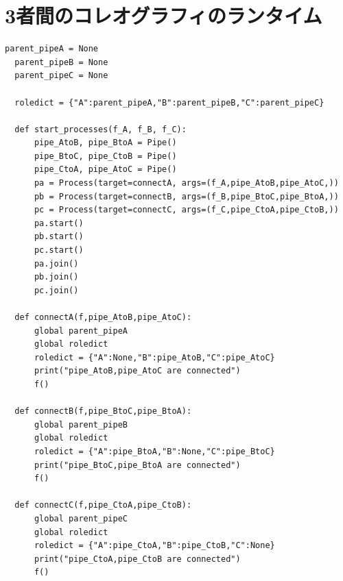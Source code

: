 \documentclass{thesis}
\begin{document}
\chapter{3者間のコレオグラフィのランタイム}
\begin{lstlisting}[numbers = none]
  parent_pipeA = None 
  parent_pipeB = None 
  parent_pipeC = None 

  roledict = {"A":parent_pipeA,"B":parent_pipeB,"C":parent_pipeC}

  def start_processes(f_A, f_B, f_C):
      pipe_AtoB, pipe_BtoA = Pipe()
      pipe_BtoC, pipe_CtoB = Pipe()
      pipe_CtoA, pipe_AtoC = Pipe()
      pa = Process(target=connectA, args=(f_A,pipe_AtoB,pipe_AtoC,)) 
      pb = Process(target=connectB, args=(f_B,pipe_BtoC,pipe_BtoA,)) 
      pc = Process(target=connectC, args=(f_C,pipe_CtoA,pipe_CtoB,)) 
      pa.start()
      pb.start()
      pc.start()
      pa.join() 
      pb.join()
      pc.join()

  def connectA(f,pipe_AtoB,pipe_AtoC):
      global parent_pipeA
      global roledict 
      roledict = {"A":None,"B":pipe_AtoB,"C":pipe_AtoC}
      print("pipe_AtoB,pipe_AtoC are connected")
      f()

  def connectB(f,pipe_BtoC,pipe_BtoA):
      global parent_pipeB
      global roledict 
      roledict = {"A":pipe_BtoA,"B":None,"C":pipe_BtoC}
      print("pipe_BtoC,pipe_BtoA are connected")
      f()

  def connectC(f,pipe_CtoA,pipe_CtoB):
      global parent_pipeC
      global roledict 
      roledict = {"A":pipe_CtoA,"B":pipe_CtoB,"C":None}
      print("pipe_CtoA,pipe_CtoB are connected")
      f()
\end{lstlisting}
\end{document}
